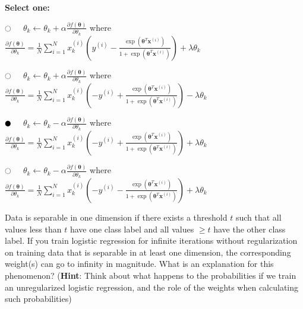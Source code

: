 \documentclass[11pt,addpoints,answers]{exam}
\newcommand{\emptycircle}{{\LARGE $\fullmoon$}\ \ }
\newcommand{\filledcircle}{{\LARGE $\newmoon$}\ \ }
\newcommand{\xv}{\mathbf{x}}
\newcommand{\thetav     }{\boldsymbol \theta     }
\begin{document}
\begin{questions}
    \textbf{Select one:}
    \begin{list}{}
        \item 
            \emptycircle 
            $\theta_k\leftarrow \theta_k + \alpha \frac{\partial f(\thetav)}{\partial \theta_k}$ where 
            $ \frac{\partial f(\thetav)}{\partial \theta_k}=\frac{1}{N}\sum_{i=1}^N x^{(i)}_k\left(y^{(i)} -\frac{\exp(\thetav^T \xv^{(i)})}{1+\exp(\thetav^T \xv^{(i)})} \right)+\lambda \theta_k$
        \item 
            \emptycircle 
            $\theta_k\leftarrow \theta_k + \alpha \frac{\partial f(\thetav)}{\partial \theta_k}$ where 
            $ \frac{\partial f(\thetav)}{\partial \theta_k}=\frac{1}{N}\sum_{i=1}^N x^{(i)}_k\left(-y^{(i)} +\frac{\exp(\thetav^T \xv^{(i)})}{1+\exp(\thetav^T \xv^{(i)})} \right)-\lambda \theta_k$
        \item 
            \filledcircle
            $\theta_k\leftarrow \theta_k - \alpha \frac{\partial f(\thetav)}{\partial \theta_k}$ where 
            $ \frac{\partial f(\thetav)}{\partial \theta_k}=\frac{1}{N}\sum_{i=1}^N x^{(i)}_k\left(-y^{(i)} +\frac{\exp(\thetav^T \xv^{(i)})}{1+\exp(\thetav^T \xv^{(i)})} \right)+\lambda \theta_k$
        \item 
            \emptycircle 
            $\theta_k\leftarrow \theta_k - \alpha \frac{\partial f(\thetav)}{\partial \theta_k}$ where 
            $ \frac{\partial f(\thetav)}{\partial \theta_k}=\frac{1}{N}\sum_{i=1}^N x^{(i)}_k\left(-y^{(i)} -\frac{\exp(\thetav^T \xv^{(i)})}{1+\exp(\thetav^T \xv^{(i)})} \right)+\lambda \theta_k$
    \end{list}

    
    \newpage
    \question[2] Data is separable in one dimension if there exists a threshold $t$ such that all values less than $t$ have one class label and all values $\geq t$ have the other class label. If you train logistic regression for infinite iterations without 
    regularization on training data that is separable in at least one dimension,
    the corresponding weight(s) can go to infinity in magnitude. What is an explanation for this phenomenon? (\textbf{Hint}: Think about what happens to the probabilities if we train an unregularized logistic regression, and the role of the weights when calculating such probabilities)


\end{questions}
\end{document}
